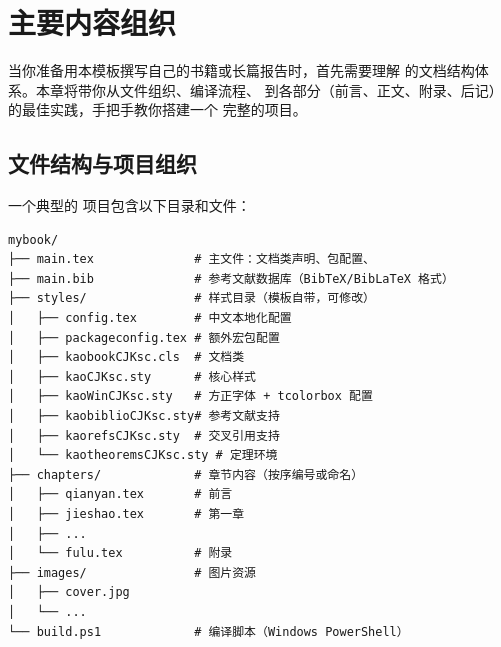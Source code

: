 
\setchapterpreamble[u]{\margintoc}
\chapter{主要内容组织}

当你准备用本模板撰写自己的书籍或长篇报告时，首先需要理解
 的文档结构体系。本章将带你从文件组织、编译流程、
到各部分（前言、正文、附录、后记）的最佳实践，手把手教你搭建一个
完整的项目。


\section{文件结构与项目组织}


一个典型的  项目包含以下目录和文件：

\begin{lstlisting}[style=kaolstplain]
mybook/
├── main.tex              # 主文件：文档类声明、包配置、
├── main.bib              # 参考文献数据库（BibTeX/BibLaTeX 格式）
├── styles/               # 样式目录（模板自带，可修改）
│   ├── config.tex        # 中文本地化配置
│   ├── packageconfig.tex # 额外宏包配置
│   ├── kaobookCJKsc.cls  # 文档类
│   ├── kaoCJKsc.sty      # 核心样式
│   ├── kaoWinCJKsc.sty   # 方正字体 + tcolorbox 配置
│   ├── kaobiblioCJKsc.sty# 参考文献支持
│   ├── kaorefsCJKsc.sty  # 交叉引用支持
│   └── kaotheoremsCJKsc.sty # 定理环境
├── chapters/             # 章节内容（按序编号或命名）
│   ├── qianyan.tex       # 前言
│   ├── jieshao.tex       # 第一章
│   ├── ...
│   └── fulu.tex          # 附录
├── images/               # 图片资源
│   ├── cover.jpg
│   └── ...
└── build.ps1             # 编译脚本（Windows PowerShell）
\end{lstlisting}



